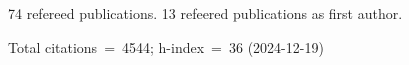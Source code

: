 74 refereed publications. 13 refeered publications as first author.

Total citations~=~4544; h-index~=~36 (2024-12-19)